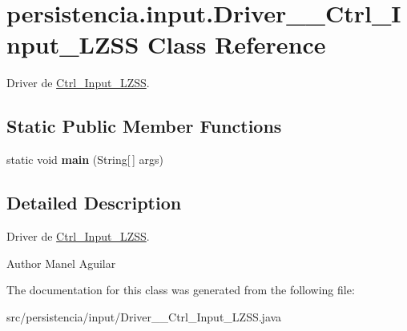 \hypertarget{classpersistencia_1_1input_1_1Driver____Ctrl__Input__LZSS}{}\section{persistencia.\+input.\+Driver\+\_\+\+\_\+\+Ctrl\+\_\+\+Input\+\_\+\+L\+Z\+SS Class Reference}
\label{classpersistencia_1_1input_1_1Driver____Ctrl__Input__LZSS}


Driver de \hyperlink{classpersistencia_1_1input_1_1Ctrl__Input__LZSS}{Ctrl\+\_\+\+Input\+\_\+\+L\+Z\+SS}.  


\subsection*{Static Public Member Functions}
\begin{DoxyCompactItemize}
\item 
\mbox{\label{classpersistencia_1_1input_1_1Driver____Ctrl__Input__LZSS_a28b3106d1ed28319e5a7066c975da375}} 
static void {\bfseries main} (String\mbox{[}$\,$\mbox{]} args)
\end{DoxyCompactItemize}


\subsection{Detailed Description}
Driver de \hyperlink{classpersistencia_1_1input_1_1Ctrl__Input__LZSS}{Ctrl\+\_\+\+Input\+\_\+\+L\+Z\+SS}. 

\begin{DoxyAuthor}{Author}
Manel Aguilar 
\end{DoxyAuthor}


The documentation for this class was generated from the following file\+:\begin{DoxyCompactItemize}
\item 
src/persistencia/input/Driver\+\_\+\+\_\+\+Ctrl\+\_\+\+Input\+\_\+\+L\+Z\+S\+S.\+java\end{DoxyCompactItemize}
